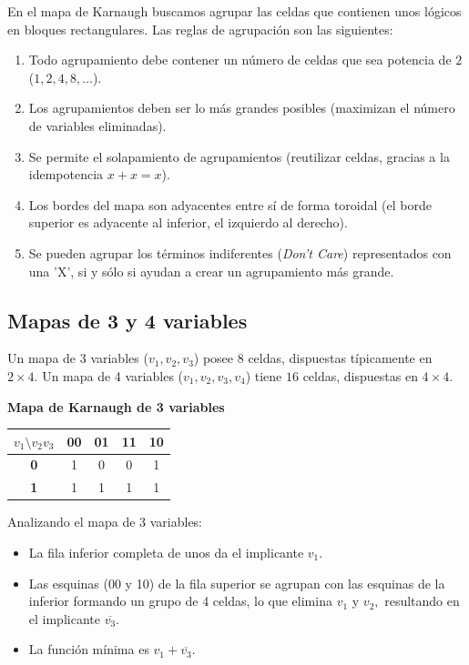 En el mapa de Karnaugh buscamos agrupar las celdas que contienen unos lógicos en bloques rectangulares.
Las reglas de agrupación son las siguientes:
\begin{enumerate}
    \item Todo agrupamiento debe contener un número de celdas que sea potencia de $2$ ($1, 2, 4, 8, \dots$).
    \item Los agrupamientos deben ser lo más grandes posibles (maximizan el número de variables eliminadas).
    \item Se permite el solapamiento de agrupamientos (reutilizar celdas, gracias a la idempotencia $x+x=x$).
    \item Los bordes del mapa son adyacentes entre sí de forma toroidal (el borde superior es adyacente al inferior, el izquierdo al derecho).
    \item Se pueden agrupar los términos indiferentes (\textit{Don't Care}) representados con una 'X', si y sólo si ayudan a crear un agrupamiento más grande.
\end{enumerate}

\subsection{Mapas de 3 y 4 variables}
Un mapa de 3 variables ($v_1, v_2, v_3$) posee $8$ celdas, dispuestas típicamente en $2 \times 4.$ Un mapa de 4 variables ($v_1, v_2, v_3, v_4$) tiene $16$ celdas, dispuestas en $4 \times 4.$

\begin{center}
\textbf{Mapa de Karnaugh de 3 variables} \\
\begin{tabular}{|c|c|c|c|c|}
\hline
 $v_1 \setminus v_2v_3$ & \textbf{00} & \textbf{01} & \textbf{11} & \textbf{10} \\ \hline
 \textbf{0} & 1 & 0 & 0 & 1 \\ \hline
 \textbf{1} & 1 & 1 & 1 & 1 \\ \hline
\end{tabular}
\end{center}

Analizando el mapa de 3 variables:
\begin{itemize}
    \item La fila inferior completa de unos da el implicante $v_1.$
    \item Las esquinas (00 y 10) de la fila superior se agrupan con las esquinas de la inferior formando un grupo de 4 celdas, lo que elimina $v_1$ y $v_2,$ resultando en el implicante $\overline{v_3}.$
    \item La función mínima es $v_1 + \overline{v_3}.$
\end{itemize}

